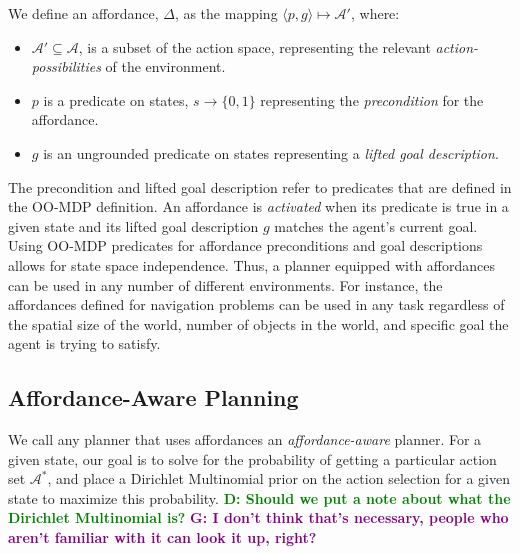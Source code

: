 \documentclass[conference]{IEEEtran}
\newcommand{\dnote}[1]{\textcolor{Green}{\textbf{D: #1}}}
\newcommand{\gnote}[1]{\textcolor{Purple}{\textbf{G: #1}}}
\begin{document}
We define an affordance, $\Delta$,
as the mapping $\langle p,g\rangle \longmapsto \mathcal{A}'$,
where:
\begin{itemize}
\item[] $\mathcal{A}' \subseteq \mathcal{A}$, is a subset of the action space, representing the relevant {\it action-possibilities} of the environment.
\item[] $p$ is a predicate on states, $s \longrightarrow \{$0$, 1\}$
  representing the {\em precondition} for the affordance.
\item[] $g$ is an ungrounded predicate on states representing a {\it lifted goal description}.
\end{itemize}
The precondition and lifted goal description refer to predicates that are defined in the OO-MDP definition.
An affordance is {\it activated} when its predicate is true in a given state and its lifted goal description $g$ matches the agent's current goal. 
Using OO-MDP predicates for affordance preconditions and goal descriptions 
allows for state space independence. Thus, a planner equipped with
affordances can be used in any number of different environments. For instance, the affordances defined for 
navigation problems can be used in any task regardless of the spatial size of the world, 
number of objects in the world, and specific goal the agent is trying to satisfy.

\subsection{Affordance-Aware Planning}
We call any planner that
uses affordances an {\it affordance-aware} planner. For a given state, 
our goal is to solve for the probability of getting a particular action set $\mathcal{A}^*$, and place a Dirichlet Multinomial
prior on the action selection for a given state to maximize this probability. \dnote{Should we put a note about what the Dirichlet Multinomial is?} \gnote{I don't think that's necessary, people who aren't familiar with it can look it up, right?}
\end{document}
